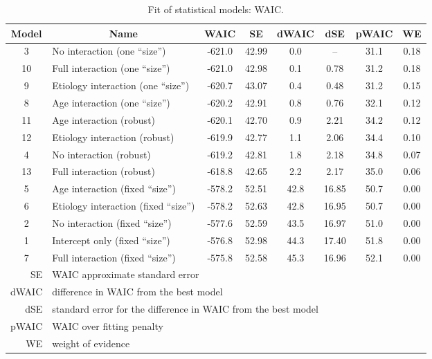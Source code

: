 \begin{table}[h!]
	\centering
	\begin{tabular}{|c|lcccccc|} 
		\hline
		Model & \multicolumn{1}{c}{Name} & WAIC & SE & dWAIC & dSE & pWAIC & WE \\[0.5ex] 
		\hline\hline
		\rowcolor{gray}
		3 & No interaction (one ``size'') & -621.0 & 42.99 & 0.0 & -- & 31.1 & 0.18 \\
		10 & Full interaction (one ``size'') & -621.0 & 42.98 & 0.1 & 0.78 & 31.2 & 0.18 \\
		\rowcolor{gray}
		9 & Etiology interaction (one ``size'') & -620.7 & 43.07 & 0.4 & 0.48 & 31.2 & 0.15 \\
		8 & Age interaction (one ``size'') & -620.2 & 42.91 & 0.8 & 0.76 & 32.1 & 0.12 \\
		\rowcolor{gray}
		11 & Age interaction (robust) & -620.1 & 42.70 & 0.9 & 2.21 & 34.2 & 0.12 \\
		12 & Etiology interaction (robust) & -619.9 & 42.77 & 1.1 & 2.06 & 34.4 & 0.10 \\
		\rowcolor{gray}
		4 & No interaction (robust) & -619.2 & 42.81 & 1.8 & 2.18 & 34.8 & 0.07 \\
		13 & Full interaction (robust) & -618.8 & 42.65 & 2.2 & 2.17 & 35.0 & 0.06 \\
		\rowcolor{gray}
		5 & Age interaction (fixed ``size'') & -578.2 & 52.51 & 42.8 & 16.85 & 50.7 & 0.00 \\
		6 & Etiology interaction (fixed ``size'') & -578.2 & 52.63 & 42.8 & 16.95 & 50.7 & 0.00 \\
		\rowcolor{gray}
		2 & No interaction (fixed ``size'') & -577.6 & 52.59 & 43.5 & 16.97 & 51.0 & 0.00 \\
		1 & Intercept only (fixed ``size'') & -576.8 & 52.98 & 44.3 & 17.40 & 51.8 & 0.00 \\
		\rowcolor{gray}
		7 & Full interaction (fixed ``size'') & -575.8 & 52.58 & 45.3 & 16.96 & 52.1 & 0.00 \\
		\hline\hline
		\multicolumn{1}{|r|}{\small SE} & \multicolumn{7}{l|}{\small WAIC approximate standard error} \\
		\multicolumn{1}{|r|}{\small dWAIC} & \multicolumn{7}{l|}{\small difference in WAIC from the best model} \\
		\multicolumn{1}{|r|}{\small dSE} & \multicolumn{7}{l|}{\small standard error for the difference in WAIC from the best model} \\
		\multicolumn{1}{|r|}{\small pWAIC} & \multicolumn{7}{l|}{\small WAIC over fitting penalty} \\
		\multicolumn{1}{|r|}{\small WE} & \multicolumn{7}{l|}{\small weight of evidence} \\
		\hline
	\end{tabular}
	\caption[Fit of statistical models: WAIC]{Fit of statistical models: WAIC.}
	\label{tab:WAIC}
\end{table}
